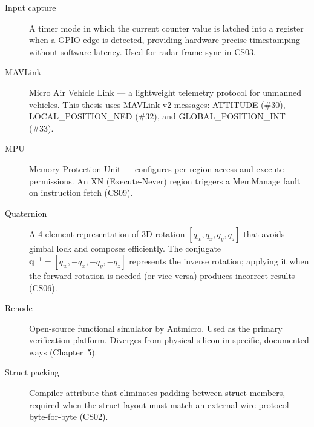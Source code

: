 \begin{description}
\item[Input capture] A timer mode in which the current counter value is latched into a register when a GPIO edge is detected, providing hardware-precise timestamping without software latency. Used for radar frame-sync in CS03.

\item[MAVLink] Micro Air Vehicle Link --- a lightweight telemetry protocol for unmanned vehicles. This thesis uses MAVLink v2 messages: ATTITUDE (\#30), LOCAL\_POSITION\_NED (\#32), and GLOBAL\_POSITION\_INT (\#33).

\item[MPU] Memory Protection Unit --- configures per-region access and execute permissions. An XN (Execute-Never) region triggers a MemManage fault on instruction fetch (CS09).

\item[Quaternion] A 4-element representation of 3D rotation $[q_w, q_x, q_y, q_z]$ that avoids gimbal lock and composes efficiently. The conjugate $\mathbf{q}^{-1} = [q_w, -q_x, -q_y, -q_z]$ represents the inverse rotation; applying it when the forward rotation is needed (or vice versa) produces incorrect results (CS06).

\item[Renode] Open-source functional simulator by Antmicro. Used as the primary verification platform. Diverges from physical silicon in specific, documented ways (Chapter~5).

\item[Struct packing] Compiler attribute that eliminates padding between struct members, required when the struct layout must match an external wire protocol byte-for-byte (CS02).
\end{description}